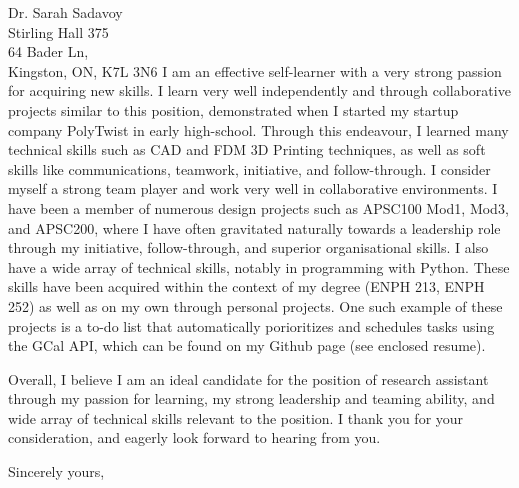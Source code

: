 \documentclass[11pt]{letter} %
\begin{document}
\begin{letter}{Dr. Sarah Sadavoy \\
Stirling Hall 375 \\
64 Bader Ln, \\
Kingston, ON, K7L 3N6}
I am an effective self-learner with a very strong passion for acquiring new skills. I learn very well independently and through collaborative projects similar to this position, demonstrated when I started my startup company PolyTwist in early high-school. Through this endeavour, I learned many technical skills such as CAD and FDM 3D Printing techniques, as well as soft skills like communications, teamwork, initiative, and follow-through. I consider myself a strong team player and work very well in collaborative environments. I have been a member of numerous design projects such as APSC100 Mod1, Mod3, and APSC200, where I have often gravitated naturally towards a leadership role through my initiative, follow-through, and superior organisational skills. I also have a wide array of technical skills, notably in programming with Python. These skills have been acquired within the context of my degree (ENPH 213, ENPH 252) as well as on my own through personal projects. One such example of these projects is a to-do list that automatically porioritizes and schedules tasks using the GCal API, which can be found on my Github page (see enclosed resume).

Overall, I believe I am an ideal candidate for the position of research assistant through my passion for learning, my strong leadership and teaming ability, and wide array of technical skills relevant to the position. I thank you for your consideration, and eagerly look forward to hearing from you.

\closing{Sincerely yours,}


\end{letter}
\end{document}
